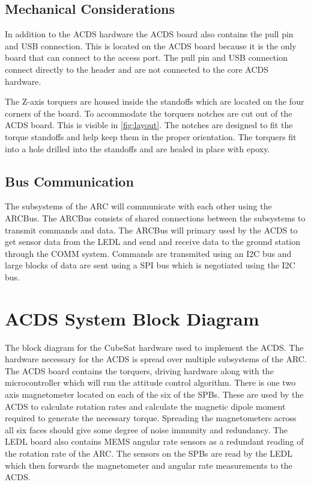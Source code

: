 \subsection{Mechanical Considerations}
In addition to the \ac{ACDS} hardware the \ac{ACDS} board also contains the pull pin and USB connection. This is located on the \ac{ACDS} board because it is the only board that can connect to the access port. The pull pin and USB connection connect directly to the header and are not connected to the core \ac{ACDS} hardware. 

The Z-axis torquers are housed inside the standoffs which are located on the four corners of the board. To accommodate the torquers notches are cut out of the \ac{ACDS} board. This is visible in \cref{fig:layout}. The notches are designed to fit the torque standoffs and help keep them in the proper orientation. The torquers fit into a hole drilled into the standoffs and are healed in place with epoxy. 


\subsection{Bus Communication}

The subsystems of the \ac{ARC} will communicate with each other using the ARCBus. The ARCBus consists of shared connections between the subsystems to transmit commands and data. The ARCBus will primary used by the \ac{ACDS} to get sensor data from the \ac{LEDL} and send and receive data to the ground station through the COMM system. Commands are transmited using an \ac{I2C} bus and large blocks of data are sent using a SPI bus which is negotiated using the \ac{I2C} bus.

\section{\acl{ACDS} System Block Diagram}

The block diagram for the CubeSat hardware used to implement the \ac{ACDS}. The hardware necessary for the \ac{ACDS} is spread over multiple subsystems of the \ac{ARC}. The \ac{ACDS} board contains the torquers, driving hardware along with the microcontroller which will run the attitude control algorithm. There is one two axis magnetometer located on each of the six of the \acp{SPB}. These are used by the \ac{ACDS} to calculate rotation rates and calculate the magnetic dipole moment required to generate the necessary torque. Spreading the magnetometers across all six faces should give some degree of noise immunity and redundancy. The \ac{LEDL} board also contains \ac{MEMS} angular rate sensors as a redundant reading of the rotation rate of the \ac{ARC}. The sensors on the \acp{SPB} are read by the \ac{LEDL} which then forwards the magnetometer and angular rate measurements to the \ac{ACDS}.

